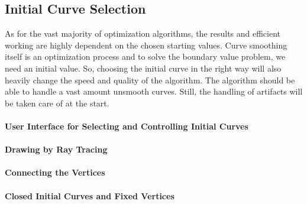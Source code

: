 \documentclass{stdlocal}
\begin{document}



\subsection{Initial Curve Selection} %
\label{sub:initial_curve_selection}
  As for the vast majority of optimization algorithms, the results and efficient working are highly dependent on the chosen starting values.
  Curve smoothing itself is an optimization process and to solve the boundary value problem, we need an initial value.
  So, choosing the initial curve in the right way will also heavily change the speed and quality of the algorithm.
  The algorithm should be able to handle a vast amount unsmooth curves.
  Still, the handling of artifacts will be taken care of at the start.
  \paragraph{User Interface for Selecting and Controlling Initial Curves}
  \paragraph{Drawing by Ray Tracing}
  \paragraph{Connecting the Vertices}
  \paragraph{Closed Initial Curves and Fixed Vertices}
\end{document}
